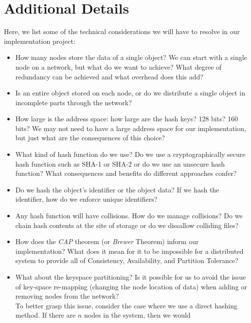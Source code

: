 \documentclass[12pt]{article}
\begin{document}
    \section{Additional Details}
    Here, we list some of the technical considerations we will have to resolve
    in our implementation project:
    \begin{itemize}
        \item How many nodes store the data of a single object?  We can start
            with a single node on a network, but what do we want to achieve?
            What degree of redundancy can be achieved and what overhead does
            this add?
        \item Is an entire object stored on each node, or do we distribute a
            single object in incomplete parts through the network?
        \item How large is the address space: how large are the hash keys?  128
            bits?  160 bits?  We may not need to have a large address space for
            our implementation, but just what are the consequences of this
            choice?
        \item What kind of hash function do we use?  Do we use a
            cryptographically secure hash function such as SHA-1 or SHA-2 or do
            we use an unsecure hash function?  What consequences and benefits do
            different approaches confer?
        \item Do we hash the object's identifier or the object data?  If we hash
            the identifier, how do we enforce unique identifiers?
        \item Any hash function will have collisions.  How do we manage
            collisions?  Do we chain hash contents at the site of storage or do
            we dissallow colliding files?
        \item How does the \textit{CAP} theorem (or \textit{Brewer} Theorem)
            inform our implementation? What does it mean for it to be impossible
            for a distributed system to provide all of Consistency,
            Availability, and Partition Tolerance?
        \item What about the keyspace partitioning?  Is it possible for us to
            avoid the issue of key-space re-mapping (changing the node location
            of data) when adding or removing nodes from the network?\\
            To better grasp this issue, consider the case where we use a direct
            hashing method.  If there are $n$ nodes in the system, then we would

\end{itemize}
\end{document}
